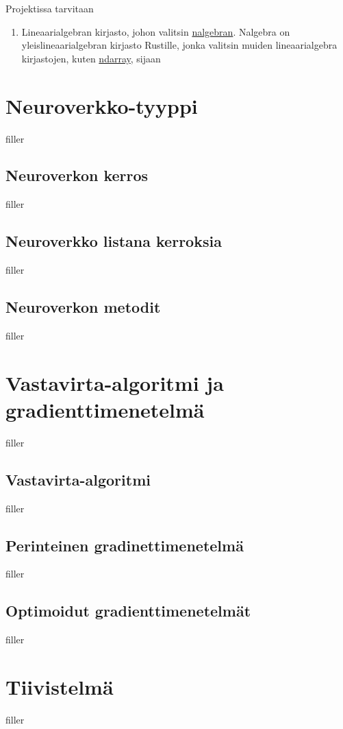 \documentclass{article}
\begin{document}
Projektissa tarvitaan
\begin{enumerate}
    \item Lineaarialgebran kirjasto, johon valitsin \href{https://nalgebra.org/}{nalgebran}. 
    Nalgebra on yleislineaarialgebran kirjasto Rustille, jonka valitsin muiden lineaarialgebra kirjastojen, kuten \href{https://docs.rs/ndarray/latest/ndarray/}{ndarray}, sijaan
\end{enumerate}


\section{Neuroverkko-tyyppi}

filler

\subsection{Neuroverkon kerros}

filler

\subsection{Neuroverkko listana kerroksia}

filler

\subsection{Neuroverkon metodit}

filler

\section{Vastavirta-algoritmi ja gradienttimenetelmä}

filler

\subsection{Vastavirta-algoritmi}

filler

\subsection{Perinteinen gradinettimenetelmä}

filler

\subsection{Optimoidut gradienttimenetelmät}

filler

\section{Tiivistelmä}

filler

\printbibliography
\end{document}
